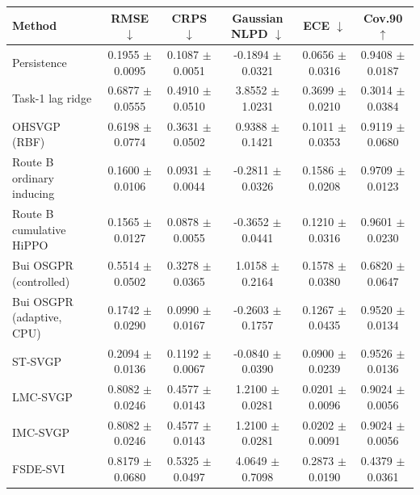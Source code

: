 \begin{tabular}{lccccc}
\toprule
Method & RMSE $\downarrow$ & CRPS $\downarrow$ & Gaussian NLPD $\downarrow$ & ECE $\downarrow$ & Cov.90 $\uparrow$ \\
\midrule
Persistence & 0.1955 $\pm$ 0.0095 & 0.1087 $\pm$ 0.0051 & -0.1894 $\pm$ 0.0321 & 0.0656 $\pm$ 0.0316 & 0.9408 $\pm$ 0.0187 \\
Task-1 lag ridge & 0.6877 $\pm$ 0.0555 & 0.4910 $\pm$ 0.0510 & 3.8552 $\pm$ 1.0231 & 0.3699 $\pm$ 0.0210 & 0.3014 $\pm$ 0.0384 \\
OHSVGP (RBF) & 0.6198 $\pm$ 0.0774 & 0.3631 $\pm$ 0.0502 & 0.9388 $\pm$ 0.1421 & 0.1011 $\pm$ 0.0353 & 0.9119 $\pm$ 0.0680 \\
Route B ordinary inducing & 0.1600 $\pm$ 0.0106 & 0.0931 $\pm$ 0.0044 & -0.2811 $\pm$ 0.0326 & 0.1586 $\pm$ 0.0208 & 0.9709 $\pm$ 0.0123 \\
Route B cumulative HiPPO & 0.1565 $\pm$ 0.0127 & 0.0878 $\pm$ 0.0055 & -0.3652 $\pm$ 0.0441 & 0.1210 $\pm$ 0.0316 & 0.9601 $\pm$ 0.0230 \\
Bui OSGPR (controlled) & 0.5514 $\pm$ 0.0502 & 0.3278 $\pm$ 0.0365 & 1.0158 $\pm$ 0.2164 & 0.1578 $\pm$ 0.0380 & 0.6820 $\pm$ 0.0647 \\
Bui OSGPR (adaptive, CPU) & 0.1742 $\pm$ 0.0290 & 0.0990 $\pm$ 0.0167 & -0.2603 $\pm$ 0.1757 & 0.1267 $\pm$ 0.0435 & 0.9520 $\pm$ 0.0134 \\
ST-SVGP & 0.2094 $\pm$ 0.0136 & 0.1192 $\pm$ 0.0067 & -0.0840 $\pm$ 0.0390 & 0.0900 $\pm$ 0.0239 & 0.9526 $\pm$ 0.0136 \\
LMC-SVGP & 0.8082 $\pm$ 0.0246 & 0.4577 $\pm$ 0.0143 & 1.2100 $\pm$ 0.0281 & 0.0201 $\pm$ 0.0096 & 0.9024 $\pm$ 0.0056 \\
IMC-SVGP & 0.8082 $\pm$ 0.0246 & 0.4577 $\pm$ 0.0143 & 1.2100 $\pm$ 0.0281 & 0.0202 $\pm$ 0.0091 & 0.9024 $\pm$ 0.0056 \\
FSDE-SVI & 0.8179 $\pm$ 0.0680 & 0.5325 $\pm$ 0.0497 & 4.0649 $\pm$ 0.7098 & 0.2873 $\pm$ 0.0190 & 0.4379 $\pm$ 0.0361 \\
\bottomrule
\end{tabular}
